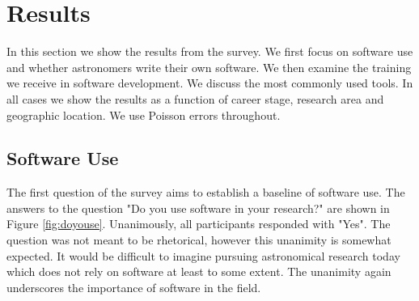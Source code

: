 \section{Results}
\label{sec:res}

In this section we show the results from the survey. We first focus on software use and whether astronomers write their own software. We then examine the training we receive in software development. We discuss the most commonly used tools. In all cases we show the results as a function of career stage, research area and geographic location. We use Poisson errors throughout. 

\subsection{Software Use}

The first question of the survey aims to establish a baseline of software use. The answers to the question "Do you use software in your research?" are shown in Figure \ref{fig:doyouse}. Unanimously, all participants responded with "Yes". The question was not meant to be rhetorical, however this unanimity is somewhat expected. It would be difficult to imagine pursuing astronomical research today which does not rely on software at least to some extent. The unanimity again underscores the importance of software in the field.